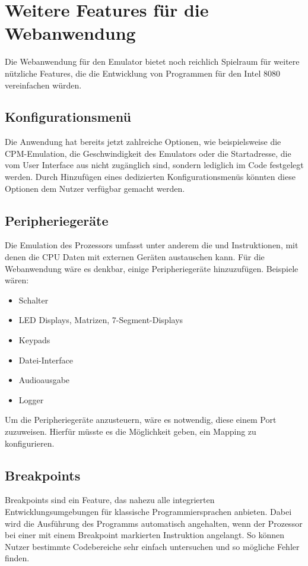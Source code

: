 \section{Weitere Features für die Webanwendung}

Die Webanwendung für den Emulator bietet noch reichlich Spielraum für weitere nützliche Features, die die Entwicklung von Programmen für den Intel 8080 vereinfachen würden.

\subsection{Konfigurationsmenü}

Die Anwendung hat bereits jetzt zahlreiche Optionen, wie beispielsweise die \ac{CPM}-Emulation, die Geschwindigkeit des Emulators oder die Startadresse, die vom User Interface aus nicht zugänglich sind, sondern lediglich im Code festgelegt werden. Durch Hinzufügen eines dedizierten Konfigurationsmenüs könnten diese Optionen dem Nutzer verfügbar gemacht werden.

\subsection{Peripheriegeräte}

Die Emulation des Prozessors umfasst unter anderem die  und  Instruktionen, mit denen die CPU Daten mit externen Geräten austauschen kann. Für die Webanwendung wäre es denkbar, einige Peripheriegeräte hinzuzufügen. Beispiele wären:

\begin{itemize}
    \item Schalter
    \item LED Displays, Matrizen, 7-Segment-Displays
    \item Keypads
    \item Datei-Interface
    \item Audioausgabe
    \item Logger
\end{itemize}

Um die Peripheriegeräte anzusteuern, wäre es notwendig, diese einem Port zuzuweisen. Hierfür müsste es die Möglichkeit geben, ein Mapping zu konfigurieren.

\subsection{Breakpoints}

Breakpoints sind ein Feature, das nahezu alle integrierten Entwicklungsumgebungen für klassische Programmiersprachen anbieten. Dabei wird die Ausführung des Programms automatisch angehalten, wenn der Prozessor bei einer mit einem Breakpoint markierten Instruktion angelangt. So können Nutzer bestimmte Codebereiche sehr einfach untersuchen und so mögliche Fehler finden.

